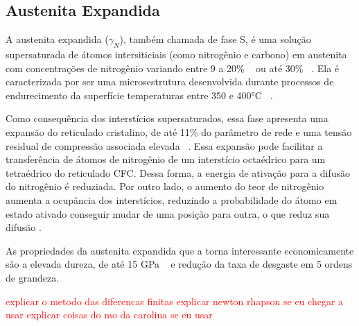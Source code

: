 \documentclass[]{politex}
\newcommand\myworries[1]{\textcolor{red}{#1}}
\begin{document}
\subsection{Austenita Expandida}
	A austenita expandida ($\gamma_{N}$), também chamada de fase S,  é uma solução supersaturada de átomos intersiticiais (como nitrogênio e carbono) em austenita com concentrações de nitrogênio variando entre 9 a 20\%  ~\cite{williamson1994metastable} ou até 30\% ~\cite{moskalioviene2011modeling}. Ela é caracterizada por ser uma microsestrutura desenvolvida durante processos de endurecimento da superfície temperaturas entre 350 e 400°C ~\cite{mandl2003nitrogen}. \par
	Como consequência dos interstícios supersaturados, essa fase apresenta uma expansão do reticulado cristalino, de até 11\% do parâmetro de rede e uma tensão residual de compressão associada elevada ~\cite{somers2018expanded}. Essa expansão pode facilitar a transferência de átomos de nitrogênio de um interstício octaédrico para um tetraédrico do reticulado CFC. Dessa forma, a energia de ativação para a difusão do nitrogênio é reduziada. Por outro lado, o aumento do teor de nitrogênio aumenta a ocupância dos interstícios, reduzindo a probabilidade do átomo em estado ativado conseguir mudar de uma posição para outra, o que reduz sua difusão \cite{christiansen2008nitrogen}. \par
	As propriedades da austenita expandida que a torna interessante economicamente são a elevada dureza, de até 15 GPa ~\cite{mandl2003nitrogen} e redução da taxa de desgaste em 5 ordens de grandeza.

\myworries{explicar o metodo das diferencas finitas}
\myworries{explicar newton rhapson se eu chegar a usar}
\myworries{explicar coisas do mo da carolina se eu usar}
\end{document}
